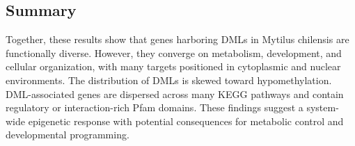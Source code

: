 \documentclass[
]{agujournal2019}
\begin{document}
\subsection{Summary}\label{summary}

Together, these results show that genes harboring DMLs in Mytilus
chilensis are functionally diverse. However, they converge on
metabolism, development, and cellular organization, with many targets
positioned in cytoplasmic and nuclear environments. The distribution of
DMLs is skewed toward hypomethylation. DML-associated genes are
dispersed across many KEGG pathways and contain regulatory or
interaction-rich Pfam domains. These findings suggest a system-wide
epigenetic response with potential consequences for metabolic control
and developmental programming.

\label{refs}
\end{document}
